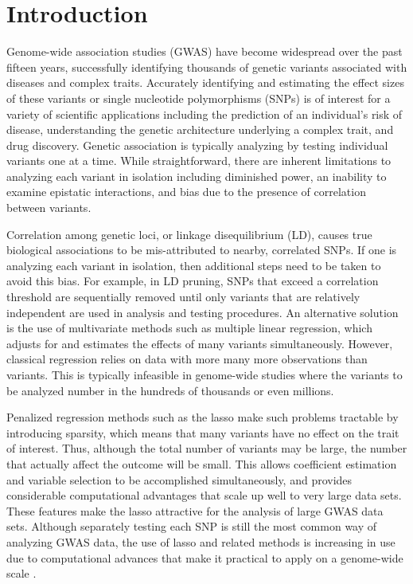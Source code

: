 
\section{Introduction}


Genome-wide association studies (GWAS) have become widespread over the past fifteen years, successfully identifying thousands of genetic variants associated with diseases and complex traits. Accurately identifying and estimating the effect sizes of these variants or single nucleotide polymorphisms (SNPs) is of interest for a variety of scientific applications including the prediction of an individual's risk of disease, understanding the genetic architecture underlying a complex trait, and drug discovery. Genetic association is typically analyzing by testing individual variants one at a time.  While straightforward, there are inherent limitations to analyzing each variant in isolation including diminished power, an inability to examine epistatic interactions, and bias due to the presence of correlation between variants.

Correlation among genetic loci, or linkage disequilibrium (LD), causes true biological associations to be mis-attributed to nearby, correlated SNPs. If one is analyzing each variant in isolation, then additional steps need to be taken to avoid this bias.  For example, in LD pruning, SNPs that exceed a correlation threshold are sequentially removed until only variants that are relatively independent are used in analysis and testing procedures. An alternative solution is the use of multivariate methods such as multiple linear regression, which adjusts for and estimates the effects of many variants simultaneously. However, classical regression relies on data with more many more observations than variants. This is typically infeasible in genome-wide studies where the variants to be analyzed number in the hundreds of thousands or even millions.

Penalized regression methods such as the lasso \citep{tibshirani1996regression} make such problems tractable by introducing sparsity, which means that many variants have no effect on the trait of interest. Thus, although the total number of variants may be large, the number that actually affect the outcome will be small. This allows coefficient estimation and variable selection to be accomplished simultaneously, and provides considerable computational advantages that scale up well to very large data sets. These features make the lasso attractive for the analysis of large GWAS data sets. Although separately testing each SNP is still the most common way of analyzing GWAS data, the use of lasso and related methods is increasing in use due to computational advances that make it practical to apply on a genome-wide scale \citep{qian2020fast, prive2018efficient}. 

